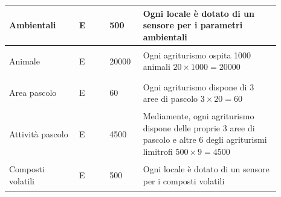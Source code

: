 \documentclass[12pt,a4paper]{article}
\begin{document}
\begin{center}
\begin{longtable}{|p{0.23\linewidth}|p{0.1\linewidth}|p{0.11\linewidth}|p{0.45\linewidth}|}
\hline
Ambientali 				& \begin{center}
\vspace{-25pt}E
\end{center}
					& \begin{center}
					\vspace{-25pt}500\end{center}
					&  Ogni locale è dotato di un sensore per i parametri ambientali \\ 

\hline
Animale 				& \begin{center}
\vspace{-25pt}E
\end{center}
					& \begin{center}
					\vspace{-25pt}20000\end{center}
					&  Ogni agriturismo ospita 1000 animali $20\times 1000=20000$ \\ 

\hline
Area pascolo 				& \begin{center}
\vspace{-25pt}E
\end{center}
					& \begin{center}
					\vspace{-25pt}60\end{center}
					&  Ogni agriturismo dispone di 3 aree di pascolo $3\times 20= 60$\\ 

\hline
Attività pascolo 				& \begin{center}
\vspace{-25pt}E
\end{center}
					& \begin{center}
					\vspace{-25pt}4500\end{center}
					&  Mediamente, ogni agriturismo dispone delle proprie 3 aree di pascolo e altre 6 degli agriturismi limitrofi $500\times 9 = 4500$\\ 

\hline
Composti volatili 				& \begin{center}
\vspace{-25pt}E
\end{center}
					& \begin{center}
					\vspace{-25pt}500\end{center}
					&  Ogni locale è dotato di un sensore per i composti volatili \\ 


\end{longtable}
\end{center}
\end{document}
